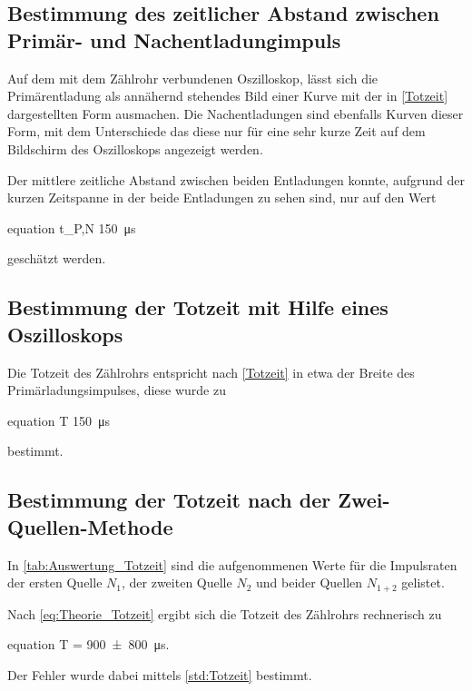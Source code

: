 	
	
\subsection{Bestimmung des zeitlicher Abstand zwischen Primär- und Nachentladungimpuls}
	
	Auf dem mit dem Zählrohr verbundenen Oszilloskop, lässt sich die Primärentladung als 
	annähernd stehendes Bild einer Kurve mit der in \cref{Totzeit} dargestellten Form 
	ausmachen. Die Nachentladungen sind ebenfalls Kurven dieser Form, mit dem Unterschiede
	das diese nur für eine sehr kurze Zeit auf dem Bildschirm des Oszilloskops angezeigt werden.
	
	Der mittlere zeitliche Abstand zwischen beiden Entladungen konnte, aufgrund der kurzen Zeitspanne 
	in der beide Entladungen zu sehen sind, nur auf den Wert
	\begin{empheq}{equation}
		\label{val:Primaer_Nachentladung_Oszilloskop}
		\Delta t_{P,N} \approx \SI{150}{\micro\second}
	\end{empheq} 
	geschätzt werden.
	 

\subsection{Bestimmung der Totzeit mit Hilfe eines Oszilloskops}

	Die Totzeit des Zählrohrs entspricht nach \cref{Totzeit} in etwa der 
	Breite des Primärladungsimpulses, diese wurde zu
	\begin{empheq}{equation}
		\label{val:Totzeit_Oszilloskop}
		T \approx \SI{150}{\micro\second}
	\end{empheq} 
	bestimmt.
	

\subsection{Bestimmung der Totzeit nach der Zwei-Quellen-Methode}

	In \cref{tab:Auswertung_Totzeit} sind die aufgenommenen Werte für die Impulsraten der ersten Quelle
	$N_{1}$, der zweiten Quelle $N_{2}$ und beider Quellen $N_{1+2}$ gelistet.
	
	

	Nach \cref{eq:Theorie_Totzeit} ergibt sich die Totzeit des Zählrohrs 
	rechnerisch zu 
	\begin{empheq}{equation}
		T = \SI{900(800)}{\micro\second}.
		\label{val:Totzeit_Berechnet}	
	\end{empheq}	
	Der Fehler wurde dabei mittels \cref{std:Totzeit} bestimmt.
	
